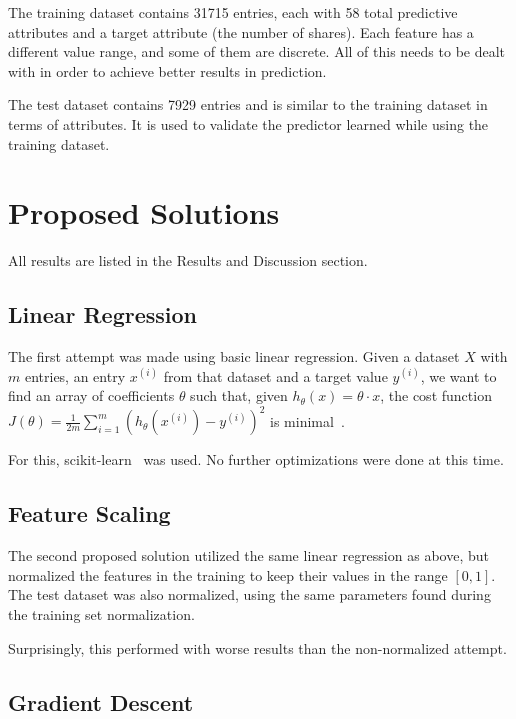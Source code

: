 \documentclass[10pt,twocolumn,letterpaper]{article}
\newcommand{\CITEONE}[2]{\mbox{#1 \cite{#2}}}
\begin{document}
The training dataset contains 31715 entries, each with 58 total predictive attributes and a target attribute (the number of shares). Each feature has a different value range, and some of them are discrete. All of this needs to be dealt with in order to achieve better results in prediction.

The test dataset contains 7929 entries and is similar to the training dataset in terms of attributes. It is used to validate the predictor learned while using the training dataset.

\section{Proposed Solutions}
All results are listed in the Results and Discussion section.

\subsection{Linear Regression}

The first attempt was made using basic linear regression. Given a dataset $X$ with $m$ entries, an entry $x^{(i)}$ from that dataset and a target value $y^{(i)}$, we want to find an array of coefficients $\theta$ such that, given $h_\theta(x) = \theta \cdot x$, the cost function $J(\theta) = \frac{1}{2m}\sum_{i=1}^{m}(h_\theta(x^{(i)}) - y^{(i)})^2$ is \CITEONE{minimal}{Classroom}. 

For this, \CITEONE{scikit-learn}{scikit-learn} was used. No further optimizations were done at this time.

\subsection{Feature Scaling}

The second proposed solution utilized the same linear regression as above, but normalized the features in the training to keep their values in the range $[0,1]$. The test dataset was also normalized, using the same parameters found during the training set normalization. 

Surprisingly, this performed with worse results than the non-normalized attempt.

\subsection{Gradient Descent}
\label{sec:gd}
\end{document}
